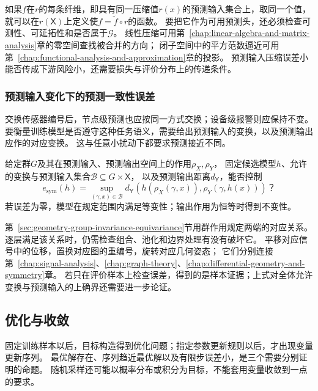 如果$f$在$r$的每条纤维，即具有同一压缩值$r(x)$的预测输入集合上，取同一个值，就可以在$r(\mathsf X)$上定义使$f=\widetilde f\circ r$的函数。
要把它作为可用预测头，还必须检查可测性、可延拓性和是否属于$\mathcal G$。
线性压缩可用第~\ref{chap:linear-algebra-and-matrix-analysis}章的零空间查找被合并的方向；
闭子空间中的平方范数逼近可用第~\ref{chap:functional-analysis-and-approximation}章的投影。
预测输入压缩误差小能否传成下游风险小，还需要损失与评价分布上的传递条件。

\subsubsection{预测输入变化下的预测一致性误差}
\label{sec:future-analysis-structural-property}

交换传感器编号后，节点级预测也应按同一方式交换；设备级报警则应保持不变。
要衡量训练模型是否遵守这种任务语义，需要给出预测输入的变换，以及预测输出应作的对应变换。
这与任意小扰动下都要求预测接近不同。

\begin{mathproblem}[预测输入变换与预测输出对应的误差]
  \label{question:future-structural-property}
  给定群$G$及其在预测输入、预测输出空间上的作用$\rho_X,\rho_Y$，
  固定候选模型$h$、允许的变换与预测输入集合$\mathcal B\subseteq G\times\mathsf X$，
  以及预测输出距离$d_{\mathsf Y}$，能否控制
  \[
    e_{\mathrm{sym}}(h)=\sup_{(\gamma,x)\in\mathcal B}
    d_{\mathsf Y}\!\left(h(\rho_X(\gamma,x)),\rho_Y(\gamma,h(x))\right)\text{？}
  \]
  若误差为零，模型在规定范围内满足等变性；输出作用为恒等时得到不变性。
\end{mathproblem}

第~\ref{sec:geometry-group-invariance-equivariance}节用群作用规定两端的对应关系。
逐层满足该关系时，仍需检查组合、池化和边界处理有没有破坏它。
平移对应信号中的位移，置换对应图的重编号，旋转对应几何姿态；
它们分别连接第~\ref{chap:signal-analysis}、\ref{chap:graph-theory}、\ref{chap:differential-geometry-and-symmetry}章。
若只在评价样本上检查误差，得到的是样本证据；上式对全体允许变换与预测输入的上确界还需要进一步论证。

\subsection{优化与收敛}
\label{sec:future-objective-object-map}
\label{sec:future-iteration-object-map}

固定训练样本以后，目标构造得到优化问题；指定参数更新规则以后，才出现变量更新序列。
最优解存在、序列趋近最优解以及有限步误差小，是三个需要分别证明的命题。
随机采样还可能以概率分布或积分为目标，不能套用变量收敛到一点的要求。

